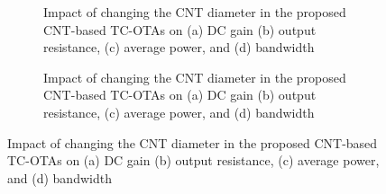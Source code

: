 
\begin{figure}[htbp]
  \centering
  \begin{subfigure}[b]{0.48\linewidth}
    \centering
    \caption{Impact of changing the CNT diameter in the proposed CNT-based TC-OTAs on (a) DC gain (b) output resistance, (c) average power, and (d) bandwidth}

  \end{subfigure}
  \hfill
  \begin{subfigure}[b]{0.48\linewidth}
    \centering
    \caption{Impact of changing the CNT diameter in the proposed CNT-based TC-OTAs on (a) DC gain (b) output resistance, (c) average power, and (d) bandwidth}

  \end{subfigure}
  \caption{Impact of changing the CNT diameter in the proposed CNT-based TC-OTAs on (a) DC gain (b) output resistance, (c) average power, and (d) bandwidth}

  \label{fig:group_7084h}
\end{figure}
